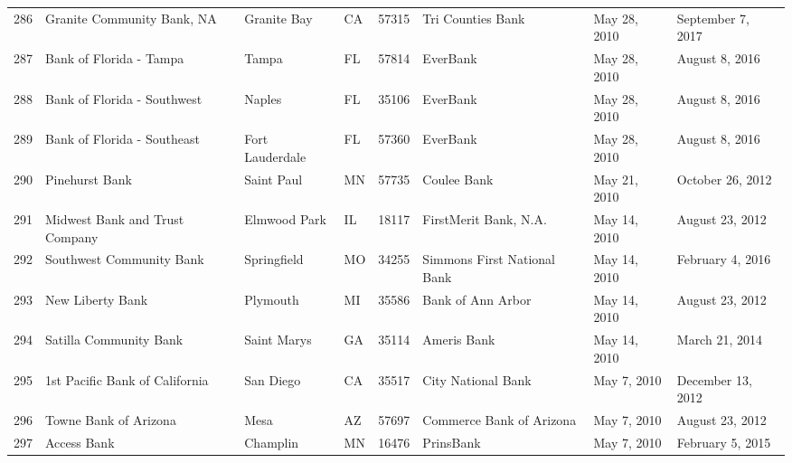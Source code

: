 \begin{tabular}{llllrlll}
286 &                         Granite Community Bank, NA &         Granite Bay &  CA &  57315 &                                  Tri Counties Bank &        May 28, 2010 &   September 7, 2017 \\
287 &                            Bank of Florida - Tampa &               Tampa &  FL &  57814 &                                           EverBank &        May 28, 2010 &      August 8, 2016 \\
288 &                        Bank of Florida - Southwest &              Naples &  FL &  35106 &                                           EverBank &        May 28, 2010 &      August 8, 2016 \\
289 &                        Bank of Florida - Southeast &     Fort Lauderdale &  FL &  57360 &                                           EverBank &        May 28, 2010 &      August 8, 2016 \\
290 &                                     Pinehurst Bank &          Saint Paul &  MN &  57735 &                                        Coulee Bank &        May 21, 2010 &    October 26, 2012 \\
291 &                     Midwest Bank and Trust Company &        Elmwood Park &  IL &  18117 &                              FirstMerit Bank, N.A. &        May 14, 2010 &     August 23, 2012 \\
292 &                           Southwest Community Bank &         Springfield &  MO &  34255 &                        Simmons First National Bank &        May 14, 2010 &    February 4, 2016 \\
293 &                                   New Liberty Bank &            Plymouth &  MI &  35586 &                                  Bank of Ann Arbor &        May 14, 2010 &     August 23, 2012 \\
294 &                             Satilla Community Bank &         Saint Marys &  GA &  35114 &                                        Ameris Bank &        May 14, 2010 &      March 21, 2014 \\
295 &                     1st Pacific Bank of California &           San Diego &  CA &  35517 &                                 City National Bank &         May 7, 2010 &   December 13, 2012 \\
296 &                              Towne Bank of Arizona &                Mesa &  AZ &  57697 &                           Commerce Bank of Arizona &         May 7, 2010 &     August 23, 2012 \\
297 &                                        Access Bank &            Champlin &  MN &  16476 &                                          PrinsBank &         May 7, 2010 &    February 5, 2015 \\

\end{tabular}
